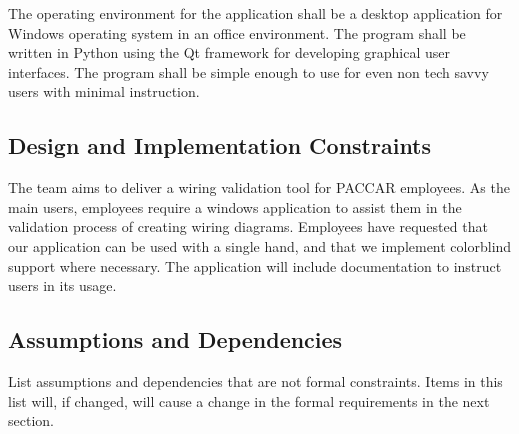The operating environment for the application shall be a desktop application for Windows operating system in an office environment. The program shall be written in Python using the Qt framework for developing graphical user interfaces. The program shall be simple enough to use for even non tech savvy users with minimal instruction.

\subsection{Design and Implementation Constraints}
The team aims to deliver a wiring validation tool for PACCAR employees. As the main users, employees require a windows application to assist them in the validation process of creating wiring diagrams. Employees have requested that our application can be used with a single hand, and that we implement colorblind support where necessary. The application will include documentation to instruct users in its usage. 

\subsection{Assumptions and Dependencies}
 List assumptions and dependencies that are not formal constraints.  Items in
 this list will, if changed, will cause a change in the formal requirements in
 the next section.

